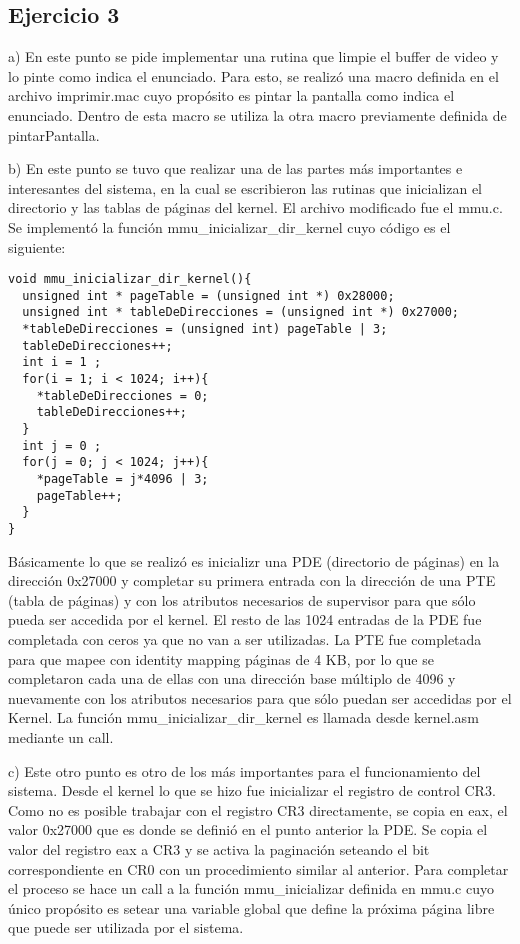 \documentclass[a4paper]{article}
\begin{document}
\subsection{Ejercicio 3}

a) En este punto se pide implementar una rutina que limpie el buffer de video y lo pinte como indica el enunciado. Para esto, se realizó una macro definida en el archivo imprimir.mac cuyo propósito es pintar la pantalla como indica el enunciado. Dentro de esta macro se utiliza la otra macro previamente definida de pintarPantalla.

b) En este punto se tuvo que realizar una de las partes más importantes e interesantes del sistema, en la cual se escribieron las rutinas que inicializan el directorio y las tablas de páginas del kernel. El archivo modificado fue el mmu.c. Se implementó la función mmu_inicializar_dir_kernel cuyo código es el siguiente:

\begin{verbatim}
void mmu_inicializar_dir_kernel(){
  unsigned int * pageTable = (unsigned int *) 0x28000;
  unsigned int * tableDeDirecciones = (unsigned int *) 0x27000;
  *tableDeDirecciones = (unsigned int) pageTable | 3;
  tableDeDirecciones++;
  int i = 1 ;
  for(i = 1; i < 1024; i++){
    *tableDeDirecciones = 0;
    tableDeDirecciones++;
  }
  int j = 0 ;
  for(j = 0; j < 1024; j++){
    *pageTable = j*4096 | 3;
    pageTable++;
  }
}
\end{verbatim}

Básicamente lo que se realizó es inicializr una PDE (directorio de páginas) en la dirección 0x27000 y completar su primera entrada con la dirección de una PTE (tabla de páginas) y con los atributos necesarios de supervisor para que sólo pueda ser accedida por el kernel. El resto de las 1024 entradas de la PDE fue completada con ceros ya que no van a ser utilizadas. La PTE fue completada para que mapee con identity mapping páginas de 4 KB, por lo que se completaron cada una de ellas con una dirección base múltiplo de 4096 y nuevamente con los atributos necesarios para que sólo puedan ser accedidas por el Kernel.
La función mmu_inicializar_dir_kernel es llamada desde kernel.asm mediante un call.

c) Este otro punto es otro de los más importantes para el funcionamiento del sistema. Desde el kernel lo que se hizo fue inicializar el registro de control CR3. Como no es posible trabajar con el registro CR3 directamente, se copia en eax, el valor 0x27000 que es donde se definió en el punto anterior la PDE. Se copia el valor del registro eax a CR3 y se activa la paginación seteando el bit correspondiente en CR0 con un procedimiento similar al anterior. Para completar el proceso se hace un call a la función mmu_inicializar definida en mmu.c cuyo único propósito es setear una variable global que define la próxima página libre que puede ser utilizada por el sistema.
\end{document}
